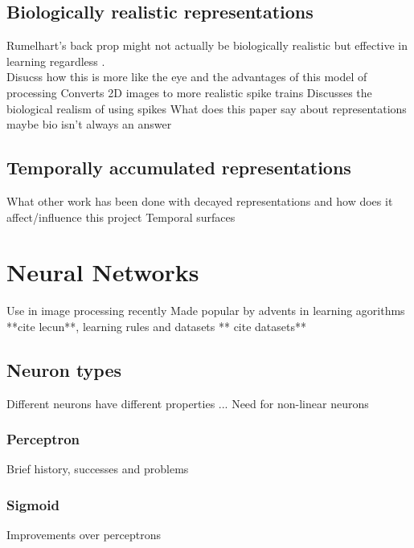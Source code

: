 \subsection{Biologically realistic representations}
Rumelhart's back prop might not actually be biologically realistic but effective in learning regardless \cite{Rumelhart1986}. \\
Disucss how this is more like the eye and the advantages of this model of processing \cite{mahowald1992vlsi}
Converts 2D images to more realistic spike trains \cite{afshar2013ripple}
Discusses the biological realism of using spikes \cite{akolkar2015can}
What does this paper say about representations maybe bio isn't always an answer \cite{fida2015pre}

\pagebreak
\subsection{Temporally accumulated representations}  %
What other work has been done with decayed representations and how does it affect/influence this project
Temporal surfaces \cite{afshar2016investigation}




\pagebreak
\section{Neural Networks}     %
Use in image processing recently
Made popular by advents in learning agorithms **cite lecun**, learning rules  \cite{Rumelhart1986} and datasets ** cite datasets**

\subsection{Neuron types}
Different neurons have different properties ...
Need for non-linear neurons

\subsubsection{Perceptron}
Brief history, successes and problems

\subsubsection{Sigmoid}
Improvements over perceptrons

